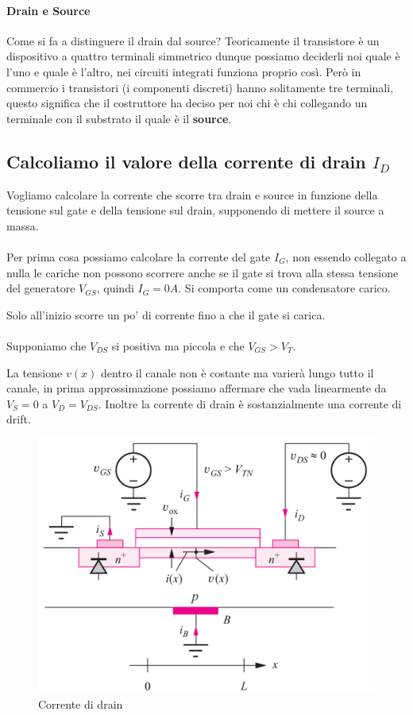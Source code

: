 \paragraph{Drain e Source}

Come si fa a distinguere il drain dal source? Teoricamente il transistore è un dispositivo a quattro terminali simmetrico dunque possiamo deciderli noi quale è l'uno e quale è l'altro, nei circuiti integrati funziona proprio così. Però in commercio i transistori (i componenti discreti) hanno solitamente tre terminali, questo significa che il costruttore ha deciso per noi chi è chi collegando un terminale con il substrato il quale è il \textbf{source}.


\subsection{Calcoliamo il valore della corrente di drain $I_D$}

Vogliamo calcolare la corrente che scorre tra drain e source in funzione della tensione sul gate e della tensione sul drain, supponendo di mettere il source a massa.

\paragraph{}
Per prima cosa possiamo calcolare la corrente del gate $I_G$, non essendo collegato a nulla le cariche non possono scorrere anche se il gate si trova alla stessa tensione del generatore $V_{GS}$, quindi $I_G = 0 A$. Si comporta come un condensatore carico.

Solo all'inizio scorre un po' di corrente fino a che il gate si carica.
\paragraph{}

Supponiamo che $V_{DS}$ si positiva ma piccola e che $V_{GS} > V_T$.

La tensione $v(x)$ dentro il canale non è costante ma varierà lungo tutto il canale, in prima approssimazione possiamo affermare che vada linearmente da $V_S = 0$ a $V_D = V_{DS}$. Inoltre la corrente di drain è sostanzialmente una corrente  di drift.

\begin{figure}[htbp]
    \centering
    \includegraphics[width=0.4\linewidth]{img/corrente_drain.png}
    \caption{Corrente di drain}
    \label{fig:corrnte_srainnee}
\end{figure}


